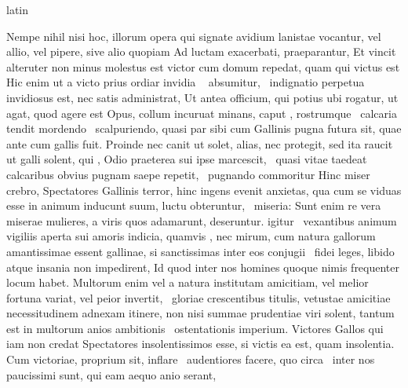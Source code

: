 \documentclass[12pt]{book}
\renewenvironment{latin}
    	{\begin{hyphenrules}{latin}}
    	{\end{hyphenrules}}
\begin{document}
\begin{pages}
\begin{latin}
\begin{Leftside}
                    Nempe nihil nisi hoc,  illorum opera qui signate  avidium lanistae vocantur, vel allio, vel pipere, sive alio quopiam Ad luctam exacerbati, praeparantur, 
                    Et vincit alteruter non minus molestus est victor cum domum repedat, 
                    quam qui victus est Hic enim ut a victo prius ordiar invidia  \ampersand\  absumitur,  \ampersand\ indignatio perpetua invidiosus est, nec satis administrat,   
                    Ut antea officium, qui potius ubi rogatur, ut agat, quod agere est Opus, collum incuruat minans, caput , rostrumque  \ampersand\ calcaria tendit mordendo  \ampersand\ scalpuriendo, 
                    quasi par sibi cum Gallinis pugna futura sit, 
                    quae ante cum gallis fuit. 
                    Proinde nec canit ut solet, alias, nec protegit, sed ita raucit ut galli solent, qui , 
                    Odio praeterea sui ipse marcescit,  \ampersand\ quasi vitae  taedeat calcaribus obvius pugnam saepe repetit,  \ampersand\ pugnando commoritur 
                    Hinc miser crebro, Spectatores Gallinis terror, hinc ingens evenit anxietas, qua cum se viduas esse in animum inducunt suum, luctu obteruntur,  \ampersand\ miseria: 
                    Sunt enim re vera miserae mulieres,  a viris quos adamarunt, deseruntur. 
                     igitur  \ampersand\ vexantibus animum vigiliis aperta sui amoris indicia, 
                    quamvis , nec mirum, cum natura gallorum amantissimae essent gallinae, si sanctissimas inter eos conjugii  \ampersand\ fidei leges, libido atque insania non impedirent, 
                    Id quod inter nos homines quoque nimis frequenter locum habet. 
                    Multorum enim vel a natura institutam amicitiam, vel melior fortuna variat, vel peior invertit,  \ampersand\ gloriae crescentibus titulis, vetustae amicitiae necessitudinem adnexam itinere, 
                    non nisi summae prudentiae viri solent, tantum est in multorum anios ambitionis  \ampersand\ ostentationis imperium. 
                    Victores Gallos qui iam non credat Spectatores insolentissimos esse, si victis ea est, quam  insolentia. 
                    Cum victoriae, proprium sit, inflare  \ampersand\ audentiores facere, quo circa  \ampersand\ inter nos paucissimi sunt, qui eam aequo anio serant, 

\end{Leftside}
\end{latin}
\end{pages}
\end{document}
